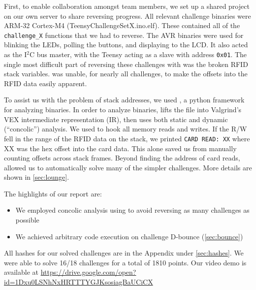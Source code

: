 First, to enable collaboration amongst team members, we set up a \ghidra shared
project on our own server to share reversing progress.
All relevant challenge binaries were ARM-32 Cortex-M4 (TeensyChallengeSetX.ino.elf).
These contained all of the \texttt{challenge\_X} functions that we had to reverse.
The AVR binaries were used for blinking the LEDs, polling the buttons, and displaying to the LCD. It also acted as the I$^{2}$C bus master, with the Teensy acting as a slave with address \texttt{0x01}.
The single most
difficult part of reversing these challenges with \ghidra was the broken RFID
stack variables. \ghidra was unable, for nearly all challenges, to make the
offsets into the RFID data easily apparent.

To assist us with the problem of stack addresses, we used \angr, a python framework for analyzing binaries. In order to analyze binaries, \angr lifts the file into Valgrind's VEX intermediate representation (IR), then uses both static and dynamic (``concolic'') analysis. We used \angr to hook all memory reads and writes. If the R/W fell in the range of the RFID
data on the stack, we printed \texttt{CARD READ: XX} where XX was the hex
offset into the card data. This alone saved us from manually counting offsets
across stack frames. Beyond finding the address of card reads, \angr allowed us to automatically solve many of the simpler challenges. More details are shown in \autoref{sec:lounge}.

\vspace{0.5cm}
\noindent The highlights of our report are:
\begin{itemize}
  \item We employed concolic analysis using \angr to avoid reversing as many challenges as possible
  \item We achieved arbitrary code execution on challenge \mbox{D-bounce} (\autoref{sec:bounce})
\end{itemize}

All hashes for our solved challenges are in the Appendix under \autoref{sec:hashes}.
We were able to solve 16/18 challenges for a total of 1810 points.
Our video demo is available at \url{https://drive.google.com/open?id=1Dxu0LSNhNxHRTTTYGJKsosiagBaUCiCX}


